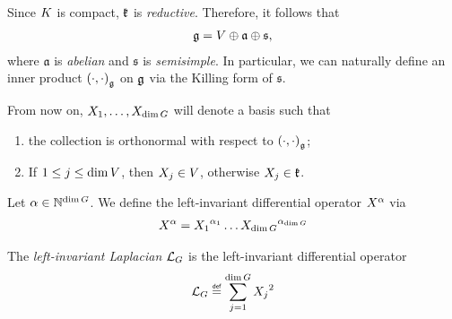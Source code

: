 Since $\CompactGroup$ is compact,
$\LieAlgebraCompactGroup$ is \emph{reductive}.
Therefore, it follows that
\begin{align*}
    \LieAlgebra = \VectorSpace \oplus \mathfrak a \oplus \mathfrak s,
\end{align*}
where $\mathfrak a$ is \emph{abelian} and $\mathfrak s$ is \emph{semisimple}.
In particular, we can naturally define an inner product $\ip[\LieAlgebra]\dummy\dummy$ on $\LieAlgebra$ via the Killing form of $\mathfrak s$.

From now on,
$X_1, \dots, X_{\dim \Group}$ will denote a basis such that
\begin{enumerate}
    \item the collection is orthonormal with respect to $\ip[\LieAlgebra]\dummy\dummy$;
    \item If $1 \leq j \leq \dim \VectorSpace$, then $X_j \in \VectorSpace$,
        otherwise $X_j \in \LieAlgebraCompactGroup$.
\end{enumerate}

\begin{definition}
    Let $\alpha \in \N^{\dim \Group}$.
    We define the left-invariant differential operator $\LeftDifferentialOperator{\alpha}$ via
    \begin{align*}
        \LeftDifferentialOperator{\alpha} =
        \LeftDifferentialOperatorFirstOrder{X_1}^{\alpha_1} \dots
        \LeftDifferentialOperatorFirstOrder{X_{\dim \Group}}^{\alpha_{\dim \Group}}
    \end{align*}
\end{definition}

\begin{definition}
\label{definition:left-invariant_Laplacian}
    The \emph{left-invariant Laplacian} $\Laplacian$ is the left-invariant differential operator
    \begin{align*}
        \Laplacian \defeq \sum_{j = 1}^{\dim \Group} \LeftDifferentialOperatorFirstOrder{X_j}^2
    \end{align*}
\end{definition}

